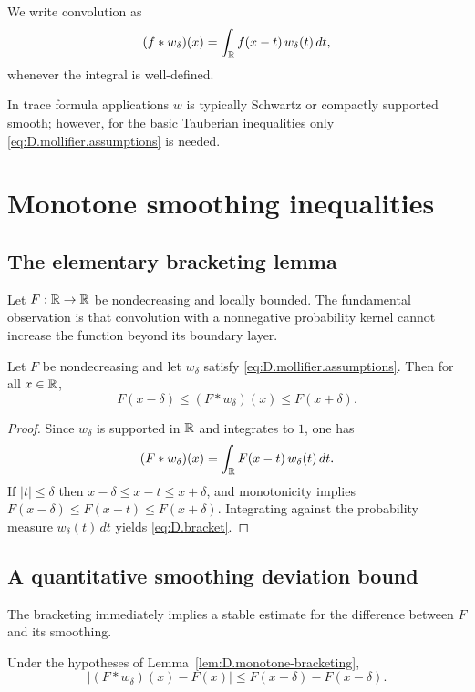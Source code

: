 We write convolution as
\[
(f*w_\delta)(x)=\int_{\mathbb{R}} f(x-t)\,w_\delta(t)\,dt,
\]
whenever the integral is well-defined.

In trace formula applications $w$ is typically Schwartz or compactly supported smooth; however, for the basic
Tauberian inequalities only \eqref{eq:D.mollifier.assumptions} is needed.

\section{Monotone smoothing inequalities}
\label{sec:D.monotone}

\subsection{The elementary bracketing lemma}
\label{subsec:D.bracketing}

Let $F:\mathbb{R}\to\mathbb{R}$ be nondecreasing and locally bounded.
The fundamental observation is that convolution with a nonnegative probability kernel cannot increase the function
beyond its boundary layer.

\begin{lemma}
\label{lem:D.monotone-bracketing}
Let $F$ be nondecreasing and let $w_\delta$ satisfy \eqref{eq:D.mollifier.assumptions}.
Then for all $x\in\mathbb{R}$,
\begin{equation}
\label{eq:D.bracket}
F(x-\delta)
\le
(F*w_\delta)(x)
\le
F(x+\delta).
\end{equation}
\end{lemma}

\begin{proof}
Since $w_\delta$ is supported in $\mathbb{R}$ and integrates to $1$, one has
\[
(F*w_\delta)(x)
=
\int_{\mathbb{R}} F(x-t)\,w_\delta(t)\,dt.
\]
If $|t|\le \delta$ then $x-\delta\le x-t\le x+\delta$, and monotonicity implies
$F(x-\delta)\le F(x-t)\le F(x+\delta)$.
Integrating against the probability measure $w_\delta(t)\,dt$ yields \eqref{eq:D.bracket}.
\end{proof}

\subsection{A quantitative smoothing deviation bound}
\label{subsec:D.deviation}

The bracketing immediately implies a stable estimate for the difference between $F$ and its smoothing.

\begin{corollary}
\label{cor:D.boundary-increment}
Under the hypotheses of Lemma~\ref{lem:D.monotone-bracketing},
\begin{equation}
\label{eq:D.deviation}
\bigl|(F*w_\delta)(x)-F(x)\bigr|
\le
F(x+\delta)-F(x-\delta).
\end{equation}
\end{corollary}


